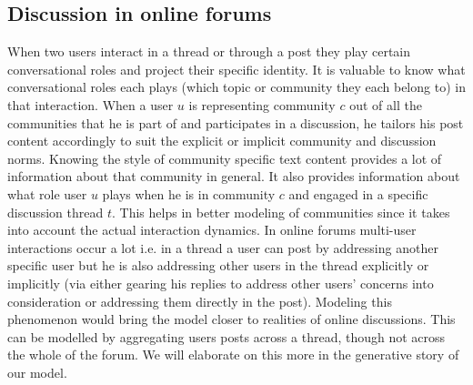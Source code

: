 \documentclass{sig-alternate}
\newcommand{\comment}[1]{\textcolor{red}{[#1]}}
\begin{document}
\subsection{Discussion in online forums}
When two users interact in a thread or through a post
they play certain conversational roles and project their specific identity.
It is valuable to know what conversational roles each plays (which topic or
community they each belong to) in that interaction. When a user $u$ is
representing community $c$ out of all the communities that he is part of and
participates in a discussion, he tailors his post content accordingly to suit
the explicit or implicit community and discussion norms. Knowing the style of
community specific text content provides a lot of information about that community 
in general. It also provides information about what role user $u$ plays when he
is in community $c$ and engaged in a specific discussion thread $t$. This helps
in better modeling of communities since it takes into account the actual 
interaction dynamics. In online forums multi-user interactions occur a lot i.e.
in a thread a user can post by addressing another specific user but he is
also addressing other users in the thread explicitly or implicitly (via either
gearing his replies to address other users' concerns into consideration or
addressing them directly in the post).
Modeling this phenomenon would bring the model closer to realities of online discussions.
This can be modelled by aggregating users posts across a thread,
though not across the whole of the forum. We will elaborate on this more in the
generative story of our model. 
\end{document}
